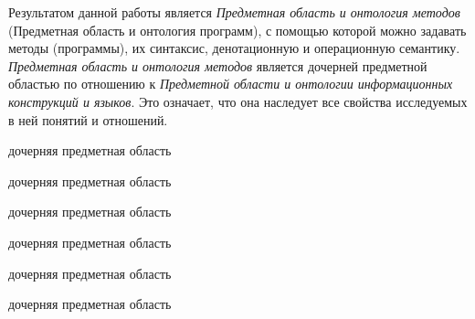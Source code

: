 Результатом данной работы является \textit{Предметная область и онтология методов} (Предметная область и онтология программ), с помощью которой можно задавать методы (программы), их синтаксис, денотационную и операционную семантику. \textit{Предметная область и онтология методов} является дочерней предметной областью по отношению к \textit{Предметной области и онтологии информационных конструкций и языков}. Это означает, что она наследует все свойства исследуемых в ней понятий и отношений.

\begin{SCn}
\begin{scnrelfromlist}{дочерняя предметная область}
    \begin{scnindent}
        \begin{scnrelfromlist}{дочерняя предметная область}
        \end{scnrelfromlist}
    \end{scnindent}
\end{scnrelfromlist}
\end{SCn}

\begin{SCn}
\begin{scnrelfromlist}{дочерняя предметная область}
    \begin{scnindent}
        \begin{scnrelfromlist}{дочерняя предметная область}
        \end{scnrelfromlist}
    \end{scnindent}
\end{scnrelfromlist}
\end{SCn}

\begin{SCn}
\begin{scnrelfromlist}{дочерняя предметная область}
    \begin{scnindent}
        \begin{scnrelfromlist}{дочерняя предметная область}
        \end{scnrelfromlist}
    \end{scnindent}
\end{scnrelfromlist}
\end{SCn}

